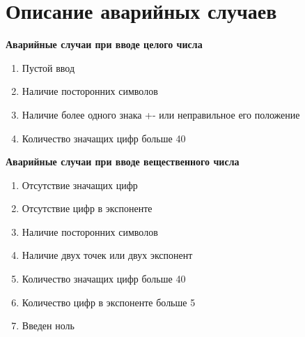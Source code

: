 \section{Описание аварийных случаев}
	\textbf{Аварийные случаи при вводе целого числа}
	\begin{enumerate}
		\item Пустой ввод
		\item Наличие посторонних символов
		\item Наличие более одного знака +- или неправильное его положение
		\item Количество значащих цифр больше 40
	\end{enumerate}
	\newpage
	\textbf{Аварийные случаи при вводе вещественного числа}
	\begin{enumerate}
		\item Отсутствие значащих цифр
		\item Отсутствие цифр в экспоненте
		\item Наличие посторонних символов 
		\item Наличие двух точек или двух экспонент
		\item Количество значащих цифр больше 40
		\item Количество цифр в экспоненте больше 5
		\item Введен ноль
	\end{enumerate}


